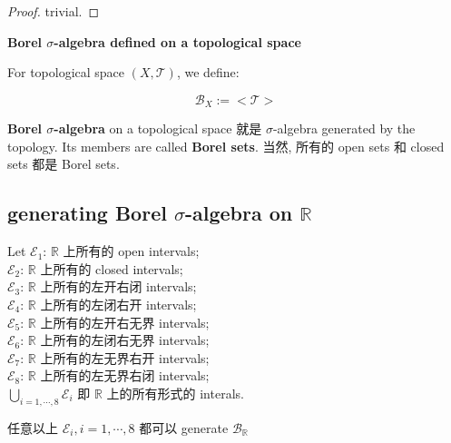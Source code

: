 \documentclass{qlnotes-export}
\begin{document}
\begin{proof}

trivial.

\end{proof}

\begin{definition}{\protect{}\label{kn-borel-sigma-algebra-defined-on-a-topological-space}{\textbf{Borel
\(\sigma\)-algebra defined on a topological space}}}

For topological space \((X,\mathcal{T})\), we define:

\[\mathcal{B}_{X} := < \mathcal{T} >\]

\end{definition}

\textbf{Borel \(\sigma\)-algebra} on a topological space 就是 \(\sigma\)-algebra generated by the topology. Its members are called \textbf{Borel sets}. 当然, 所有的 open sets 和 closed sets 都是 Borel sets.

\subsection{\texorpdfstring{generating Borel \(\sigma\)-algebra on \(\mathbb{R}\)}{generating Borel \textbackslash sigma-algebra on \textbackslash mathbb\{R\}}}\label{generating-borel-sigma-algebra-on-mathbbr}

\begin{example}

Let \(\mathcal{E}_{1}\): \(\mathbb{R}\) 上所有的 open intervals;\\
\(\mathcal{E}_{2}\): \(\mathbb{R}\) 上所有的 closed intervals;\\
\(\mathcal{E}_{3}\): \(\mathbb{R}\) 上所有的左开右闭 intervals;\\
\(\mathcal{E}_{4}\): \(\mathbb{R}\) 上所有的左闭右开 intervals;\\
\(\mathcal{E}_{5}\): \(\mathbb{R}\) 上所有的左开右无界 intervals;\\
\(\mathcal{E}_{6}\): \(\mathbb{R}\) 上所有的左闭右无界 intervals;\\
\(\mathcal{E}_{7}\): \(\mathbb{R}\) 上所有的左无界右开 intervals;\\
\(\mathcal{E}_{8}\): \(\mathbb{R}\) 上所有的左无界右闭 intervals;\\
\(\bigcup_{i = 1,\cdots,8}\mathcal{E}_{i}\) 即 \(\mathbb{R}\) 上的所有形式的 interals.

\begin{lemma}

任意以上 \(\mathcal{E}_{i},i = 1,\cdots,8\) 都可以 generate \(\mathcal{B}_{\mathbb{R}}\)

\end{lemma}

\end{example}
\end{document}
